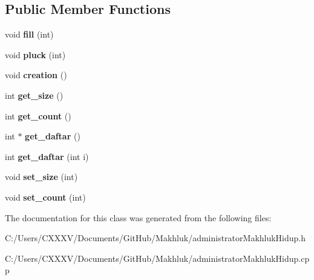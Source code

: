 \subsection*{Public Member Functions}
\begin{DoxyCompactItemize}
\item 
void {\bfseries fill} (int)\hypertarget{class_administrator_makhluk_hidup_af6b03465816e3d133204fa2e2b468fe2}{}\label{class_administrator_makhluk_hidup_af6b03465816e3d133204fa2e2b468fe2}

\item 
void {\bfseries pluck} (int)\hypertarget{class_administrator_makhluk_hidup_a5faae20a3dfedeab6432ab0a251a7533}{}\label{class_administrator_makhluk_hidup_a5faae20a3dfedeab6432ab0a251a7533}

\item 
void {\bfseries creation} ()\hypertarget{class_administrator_makhluk_hidup_ae3f91267f48512035d37ea6c6b93c668}{}\label{class_administrator_makhluk_hidup_ae3f91267f48512035d37ea6c6b93c668}

\item 
int {\bfseries get\+\_\+size} ()\hypertarget{class_administrator_makhluk_hidup_aa3da88881045da27c9fcb469215bce70}{}\label{class_administrator_makhluk_hidup_aa3da88881045da27c9fcb469215bce70}

\item 
int {\bfseries get\+\_\+count} ()\hypertarget{class_administrator_makhluk_hidup_a69edc3e32e43b014497a543a1e8bc1b9}{}\label{class_administrator_makhluk_hidup_a69edc3e32e43b014497a543a1e8bc1b9}

\item 
int $\ast$ {\bfseries get\+\_\+daftar} ()\hypertarget{class_administrator_makhluk_hidup_ade6e3de844c28f64f19745a94731184c}{}\label{class_administrator_makhluk_hidup_ade6e3de844c28f64f19745a94731184c}

\item 
int {\bfseries get\+\_\+daftar} (int i)\hypertarget{class_administrator_makhluk_hidup_a34274d86b3a2c5380ddd46422121b00e}{}\label{class_administrator_makhluk_hidup_a34274d86b3a2c5380ddd46422121b00e}

\item 
void {\bfseries set\+\_\+size} (int)\hypertarget{class_administrator_makhluk_hidup_a5181a812a939b545d9e183a20d1bea2f}{}\label{class_administrator_makhluk_hidup_a5181a812a939b545d9e183a20d1bea2f}

\item 
void {\bfseries set\+\_\+count} (int)\hypertarget{class_administrator_makhluk_hidup_ae196f8f31ce2dbe2be9074547e3164a0}{}\label{class_administrator_makhluk_hidup_ae196f8f31ce2dbe2be9074547e3164a0}

\end{DoxyCompactItemize}


The documentation for this class was generated from the following files\+:\begin{DoxyCompactItemize}
\item 
C\+:/\+Users/\+C\+X\+X\+X\+V/\+Documents/\+Git\+Hub/\+Makhluk/administrator\+Makhluk\+Hidup.\+h\item 
C\+:/\+Users/\+C\+X\+X\+X\+V/\+Documents/\+Git\+Hub/\+Makhluk/administrator\+Makhluk\+Hidup.\+cpp\end{DoxyCompactItemize}
